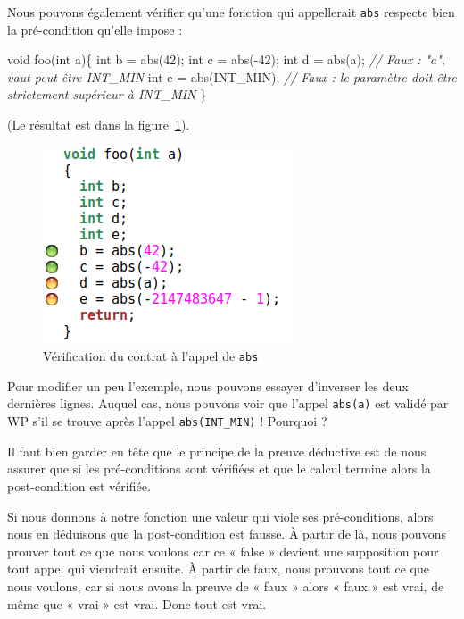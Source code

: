 \documentclass[12pt,francais,]{scrbook}
\newenvironment{Shaded}{}{}
\newcommand{\DataTypeTok}[1]{\textcolor[rgb]{0.56,0.13,0.00}{{#1}}}
\newcommand{\DecValTok}[1]{\textcolor[rgb]{0.25,0.63,0.44}{{#1}}}
\newcommand{\CommentTok}[1]{\textcolor[rgb]{0.38,0.63,0.69}{\textit{{#1}}}}
\newcommand{\NormalTok}[1]{{#1}}
\begin{document}
\clearpage

Nous pouvons également vérifier qu'une fonction qui appellerait
\texttt{abs} respecte bien la pré-condition qu'elle impose :

\begin{footnotesize}\begin{Shaded}
\begin{Highlighting}[]
\DataTypeTok{void} \NormalTok{foo(}\DataTypeTok{int} \NormalTok{a)\{}
   \DataTypeTok{int} \NormalTok{b = abs(}\DecValTok{42}\NormalTok{);}
   \DataTypeTok{int} \NormalTok{c = abs(-}\DecValTok{42}\NormalTok{);}
   \DataTypeTok{int} \NormalTok{d = abs(a);       }\CommentTok{// Faux : "a", vaut peut être INT_MIN}
   \DataTypeTok{int} \NormalTok{e = abs(INT_MIN); }\CommentTok{// Faux : le paramètre doit être strictement supérieur à INT_MIN}
\NormalTok{\}}
\end{Highlighting}
\end{Shaded}\end{footnotesize}

(Le résultat est dans la figure~\ref{fig:2-1-2-foo-1}).

\begin{figure}[htbp]
\centering
\includegraphics[scale=0.5]{2-1-2-foo-1.png}
\caption{Vérification du contrat à l'appel de \texttt{abs}}
\label{fig:2-1-2-foo-1}
\end{figure}

Pour modifier un peu l'exemple, nous pouvons essayer d'inverser les deux
dernières lignes. Auquel cas, nous pouvons voir que l'appel
\texttt{abs(a)} est validé par WP s'il se trouve après l'appel
\texttt{abs(INT\_MIN)} ! Pourquoi ?

Il faut bien garder en tête que le principe de la preuve déductive est
de nous assurer que si les pré-conditions sont vérifiées et que le
calcul termine alors la post-condition est vérifiée.

Si nous donnons à notre fonction une valeur qui viole ses
pré-conditions, alors nous en déduisons que la post-condition est
fausse. À partir de là, nous pouvons prouver tout ce que nous voulons
car ce « false » devient une supposition pour tout appel qui viendrait
ensuite. À partir de faux, nous prouvons tout ce que nous voulons, car
si nous avons la preuve de « faux » alors « faux » est vrai, de même que
« vrai » est vrai. Donc tout est vrai.
\end{document}
